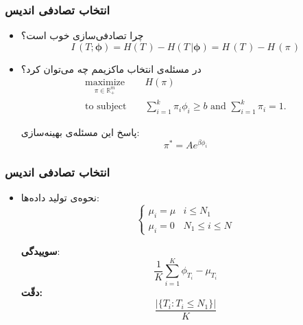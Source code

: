 \documentclass[]{beamer}
\makeatletter
\newcommand{ \RTList}{\raggedleft\rightskip\@totalleftmargin}
\makeatother
\begin{document}
\begin{persian}
\begin{frame}
\frametitle{انتخاب تصادفی اندیس}

\begin{itemize}\RTList
\item
چرا تصادفی‌سازی خوب است؟
$$I\,(T; \bm {\phi}) = H(T\,) - H(T\,|\bm{\phi}) = H\,(T\,) - H\,(\pi\,)$$

\item
در مسئله‌ی انتخاب ماکزیمم چه می‌توان کرد؟
	\begin{eqnarray*}
\underset{{ \pi} \in \mathbb{R}^m_+}{\text{maximize}} && H({\pi}) \\
\text{to subject } && \sum_{i=1}^{k} \pi_i \phi_i \geq b \mbox{ and }  \sum_{i=1}^{k} \pi_i =1.
\end{eqnarray*}

پاسخ این مسئله‌ی بهینه‌سازی:
$$\pi^* = Ae^{\beta \phi_i}$$
\end{itemize}

\end{frame}




\begin{frame}
\frametitle{انتخاب تصادفی اندیس}
\begin{minipage}[t]{0.46\linewidth}
\begin{itemize}\RTList
	\item
	نحوه‌ی تولید داده‌ها:
	\hspace{0.3cm}
	\begin{equation*}
	\begin{cases}
	\mu_i = \mu & i\leq N_1\\
	\mu_i = 0 & N_1 \leq i \leq N
	\end{cases}
	\end{equation*}

		\textbf{سوییدگی}:
		 $$\frac{1}{K} \sum_{i = 1}^{K} \phi_{T_i} - \mu_{T_i}$$
		\textbf{دقّت:}
		$$\frac{\big|\{T_i:T_i\leq N_1\}\big|}{K}$$


\end{itemize}
\end{minipage}
\end{frame}
\end{persian}
\end{document}
